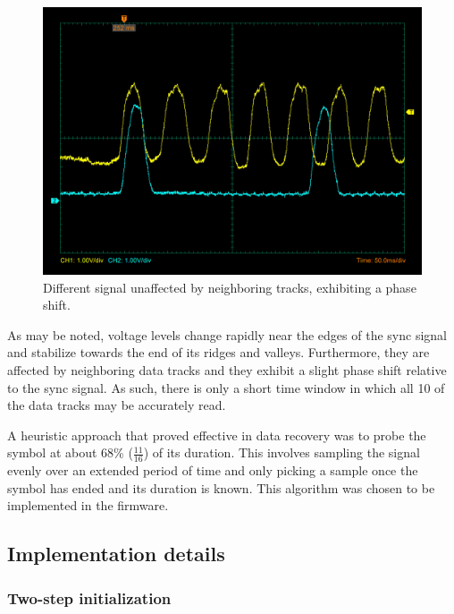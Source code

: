 \documentclass{article}
\begin{document}
	\begin{figure}[h]
		\begin{center}
			\includegraphics[width=0.6\linewidth]{img/osc2}
			\caption{Different signal unaffected by neighboring tracks,
			exhibiting a phase shift.}
		\end{center}
	\end{figure}
	
	As may be noted, voltage levels change rapidly near the edges of the sync
	signal and stabilize towards the end of its ridges and valleys.
	Furthermore, they are affected by neighboring data tracks and they exhibit
	a slight phase shift relative to the sync signal. As such, there is only a
	short time window in which all 10 of the data tracks may be accurately
	read.
	
	A heuristic approach that proved effective in data recovery was to probe
	the symbol at about 68\% ($\frac{11}{16}$) of its duration. This involves
	sampling the signal evenly over an extended period of time and only picking
	a sample once the symbol has ended and its duration is known. This
	algorithm was chosen to be implemented in the firmware.
	
	\subsection{Implementation details}
	
	\subsubsection{Two-step initialization}
	\label{sec:init}
	
\end{document}
